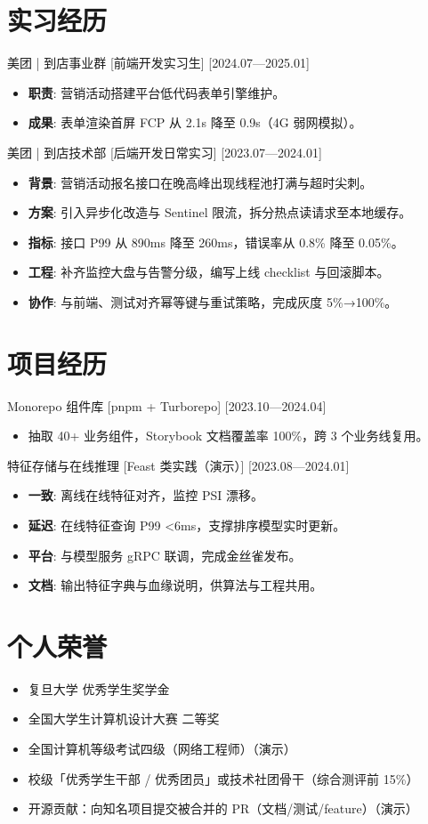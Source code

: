 \documentclass{resume-photo}
\begin{document}
\section{实习经历}
\ResumeItem
{美团 | 到店事业群}
[\textnormal{前端开发实习生}]
[2024.07—2025.01]

\begin{itemize}
  \item \textbf{职责}: 营销活动搭建平台低代码表单引擎维护。
  \item \textbf{成果}: 表单渲染首屏 FCP 从 2.1s 降至 0.9s（4G 弱网模拟）。
\end{itemize}


\ResumeItem
{美团 | 到店技术部}
[\textnormal{后端开发日常实习}]
[2023.07—2024.01]

\begin{itemize}
  \item \textbf{背景}: 营销活动报名接口在晚高峰出现线程池打满与超时尖刺。
  \item \textbf{方案}: 引入异步化改造与 Sentinel 限流，拆分热点读请求至本地缓存。
  \item \textbf{指标}: 接口 P99 从 890ms 降至 260ms，错误率从 0.8\% 降至 0.05\%。
  \item \textbf{工程}: 补齐监控大盘与告警分级，编写上线 checklist 与回滚脚本。
  \item \textbf{协作}: 与前端、测试对齐幂等键与重试策略，完成灰度 5\%→100\%。
\end{itemize}



\section{项目经历}
\ResumeItem
{Monorepo 组件库}
[\textnormal{pnpm + Turborepo}]
[2023.10—2024.04]

\begin{itemize}
  \item 抽取 40+ 业务组件，Storybook 文档覆盖率 100\%，跨 3 个业务线复用。
\end{itemize}


\ResumeItem
{特征存储与在线推理}
[\textnormal{Feast 类实践（演示）}]
[2023.08—2024.01]

\begin{itemize}
  \item \textbf{一致}: 离线在线特征对齐，监控 PSI 漂移。
  \item \textbf{延迟}: 在线特征查询 P99 <6ms，支撑排序模型实时更新。
  \item \textbf{平台}: 与模型服务 gRPC 联调，完成金丝雀发布。
  \item \textbf{文档}: 输出特征字典与血缘说明，供算法与工程共用。
\end{itemize}



\section{个人荣誉}
\begin{itemize}
  \item 复旦大学 优秀学生奖学金
  \item 全国大学生计算机设计大赛 二等奖
  \item 全国计算机等级考试四级（网络工程师）（演示）
  \item 校级「优秀学生干部 / 优秀团员」或技术社团骨干（综合测评前 15\%）
  \item 开源贡献：向知名项目提交被合并的 PR（文档/测试/feature）（演示）
\end{itemize}
\end{document}
